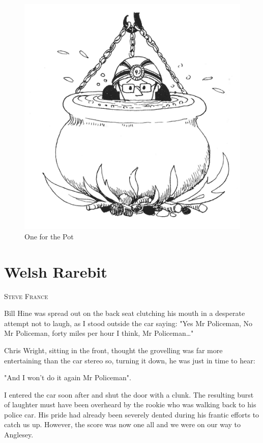 \documentclass[a5paper,openany,font 10pt]{scrbook}
\makeatletter
\newcommand{\chapterauthor}[1]{%
{\parindent0pt\vspace*{-5pt}%
\linespread{1.1}\large\scshape#1%
\par\nobreak\vspace*{35pt}}
\@afterheading%
}
\makeatother
\begin{document}
\begin{figure}[htb]
\centering
\includegraphics[width=.9\linewidth]{./images/Cartoon_10.jpg}
\caption{\label{fig:org95c3373}
One for the Pot}
\end{figure}

\chapter{Welsh Rarebit}
\label{sec:org5ca267d}
\chapterauthor{Steve France}

Bill Hine was spread out on the back seat clutching his
mouth in a desperate attempt not to laugh, as I stood outside the
car saying:
	"Yes Mr Policeman, No Mr Policeman, forty miles per hour I
think, Mr Policeman\ldots{}"

Chris Wright, sitting in the front, thought the grovelling
was far more entertaining than the car stereo so, turning it
down, he was just in time to hear:

"And I won't do it again Mr Policeman".

I entered the car soon after and shut the door with a clunk.
The resulting burst of laughter must have been overheard by the
rookie who was walking back to his police car.  His pride had
already been severely dented during his frantic efforts to catch
us up. However, the score was now one all and we were on our way
to Anglesey.
\end{document}
